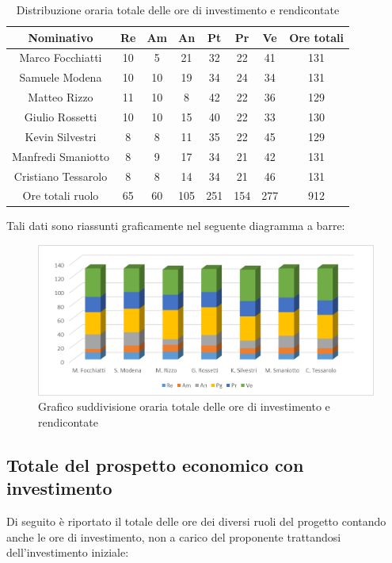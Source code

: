 \documentclass[./PianodiProgetto.tex]{subfiles}
\begin{document}
\begin{table}[H]
	\centering
	\begin{tabular}{|c|cccccc|c|}
		\hline
		Nominativo&Re&Am&An&Pt&Pr&Ve&Ore totali\\ \hline
		Marco Focchiatti&10&5&21&32&22&41&131 \\ \hline
		Samuele Modena&10&10&19&34&24&34&131 \\ \hline
		Matteo Rizzo&11&10&8&42&22&36&129 \\ \hline
		Giulio Rossetti&10&10&15&40&22&33&130 \\ \hline
		Kevin Silvestri&8&8&11&35&22&45&129 \\ \hline
		Manfredi Smaniotto&8&9&17&34&21&42&131 \\ \hline
		Cristiano Tessarolo&8&8&14&34&21&46&131 \\  \hline
		Ore totali ruolo&65&60&105&251&154&277&912 \\ \hline
	\end{tabular}
	\caption{Distribuzione oraria totale delle ore di investimento e rendicontate}
\end{table}

Tali dati sono riassunti graficamente nel seguente diagramma a barre:
\begin{figure}[H]
	\centering
	\includegraphics[width=1\linewidth]{img/grafici/OreInvestimentoRendicontateProspettoOrario}
	\caption{Grafico suddivisione oraria totale delle ore di investimento e rendicontate}
	\label{fig:ore-investimento-rendicontate-prospetto-orario}
\end{figure}

\subsection{Totale del prospetto economico con investimento}
Di seguito è riportato il totale delle ore dei diversi ruoli del progetto contando anche le ore di investimento, non a carico del proponente trattandosi dell'investimento iniziale:
\end{document}
